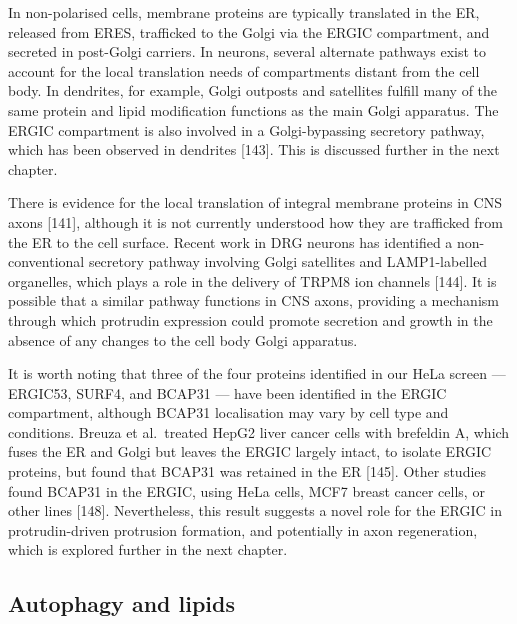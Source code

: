 \documentclass[
  12pt,
  a4paper,
]{book}
\begin{document}
In non-polarised cells, membrane proteins are typically translated in the ER, released from ERES, trafficked to the Golgi via the ERGIC compartment, and secreted in post-Golgi carriers. In neurons, several alternate pathways exist to account for the local translation needs of compartments distant from the cell body. In dendrites, for example, Golgi outposts and satellites fulfill many of the same protein and lipid modification functions as the main Golgi apparatus. The ERGIC compartment is also involved in a Golgi-bypassing secretory pathway, which has been observed in dendrites {[}143{]}. This is discussed further in the next chapter.

There is evidence for the local translation of integral membrane proteins in CNS axons {[}141{]}, although it is not currently understood how they are trafficked from the ER to the cell surface. Recent work in DRG neurons has identified a non-conventional secretory pathway involving Golgi satellites and LAMP1-labelled organelles, which plays a role in the delivery of TRPM8 ion channels {[}144{]}. It is possible that a similar pathway functions in CNS axons, providing a mechanism through which protrudin expression could promote secretion and growth in the absence of any changes to the cell body Golgi apparatus.

It is worth noting that three of the four proteins identified in our HeLa screen --- ERGIC53, SURF4, and BCAP31 --- have been identified in the ERGIC compartment, although BCAP31 localisation may vary by cell type and conditions. Breuza et al.~treated HepG2 liver cancer cells with brefeldin A, which fuses the ER and Golgi but leaves the ERGIC largely intact, to isolate ERGIC proteins, but found that BCAP31 was retained in the ER {[}145{]}. Other studies found BCAP31 in the ERGIC, using HeLa cells, MCF7 breast cancer cells, or other lines {[}148{]}. Nevertheless, this result suggests a novel role for the ERGIC in protrudin-driven protrusion formation, and potentially in axon regeneration, which is explored further in the next chapter.

\hypertarget{autophagy-and-lipids}{%
\subsection{Autophagy and lipids}\label{autophagy-and-lipids}}
\end{document}
